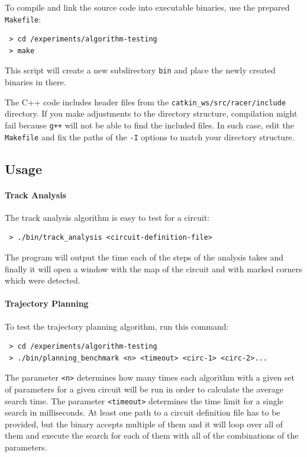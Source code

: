 To compile and link the source code into executable binaries, use the prepared \texttt{Makefile}:

\begin{verbatim}
 > cd /experiments/algorithm-testing
 > make
\end{verbatim}

This script will create a new subdirectory \texttt{bin} and place the newly created binaries in there.

The C++ code includes header files from the \texttt{catkin\_ws/src/racer/include} directory. If you make adjustments to the directory structure, compilation might fail because \texttt{g++} will not be able to find the included files. In such case, edit the \texttt{Makefile} and fix the paths of the \texttt{-I} options to match your directory structure.

\subsection{Usage}

\paragraph{Track Analysis}

The track analysis algorithm is easy to test for a circuit:

\begin{verbatim}
 > ./bin/track_analysis <circuit-definition-file>
\end{verbatim}

The program will output the time each of the steps of the analysis takes and finally it will open a window with the map of the circuit and with marked corners which were detected.

\paragraph{Trajectory Planning}
To test the trajectory planning algorithm, run this command:

\begin{verbatim}
 > cd /experiments/algorithm-testing
 > ./bin/planning_benchmark <n> <timeout> <circ-1> <circ-2>...
\end{verbatim}

The parameter \texttt{<n>} determines how many times each algorithm with a given set of parameters for a given circuit will be run in order to calculate the average search time. The parameter \texttt{<timeout>} determines the time limit for a single search in milliseconds. At least one path to a circuit definition file has to be provided, but the binary accepts multiple of them and it will loop over all of them and execute the search for each of them with all of the combinations of the parameters.

